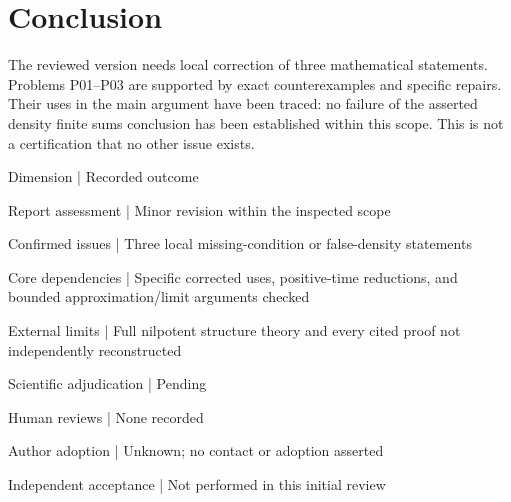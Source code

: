 \documentclass[10pt]{article}
\begin{document}
\section*{Conclusion}
The reviewed version needs local correction of three mathematical statements. Problems P01–P03 are supported by exact counterexamples and specific repairs. Their uses in the main argument have been traced: no failure of the asserted density finite sums conclusion has been established within this scope. This is not a certification that no other issue exists.\par
Dimension | Recorded outcome\par
Report assessment | Minor revision within the inspected scope\par
Confirmed issues | Three local missing-condition or false-density statements\par
Core dependencies | Specific corrected uses, positive-time reductions, and bounded approximation/limit arguments checked\par
External limits | Full nilpotent structure theory and every cited proof not independently reconstructed\par
Scientific adjudication | Pending\par
Human reviews | None recorded\par
Author adoption | Unknown; no contact or adoption asserted\par
Independent acceptance | Not performed in this initial review\par
\end{document}
